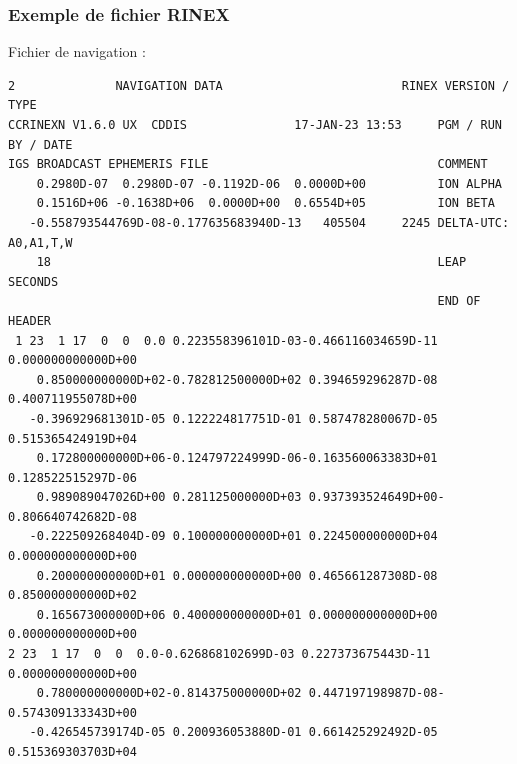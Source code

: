 \documentclass[xcolor=dvipsnames,envcountsect]{beamer}
\begin{document}
\begin{frame}
	\frametitle{Exemple de fichier RINEX}

	Fichier de navigation :
	\begin{lstlisting}[basicstyle=\tiny]
2              NAVIGATION DATA                         RINEX VERSION / TYPE
CCRINEXN V1.6.0 UX  CDDIS               17-JAN-23 13:53     PGM / RUN BY / DATE 
IGS BROADCAST EPHEMERIS FILE                                COMMENT             
	0.2980D-07  0.2980D-07 -0.1192D-06  0.0000D+00          ION ALPHA           
	0.1516D+06 -0.1638D+06  0.0000D+00  0.6554D+05          ION BETA            
   -0.558793544769D-08-0.177635683940D-13   405504     2245 DELTA-UTC: A0,A1,T,W
	18                                                      LEAP SECONDS        
															END OF HEADER       
 1 23  1 17  0  0  0.0 0.223558396101D-03-0.466116034659D-11 0.000000000000D+00
	0.850000000000D+02-0.782812500000D+02 0.394659296287D-08 0.400711955078D+00
   -0.396929681301D-05 0.122224817751D-01 0.587478280067D-05 0.515365424919D+04
	0.172800000000D+06-0.124797224999D-06-0.163560063383D+01 0.128522515297D-06
	0.989089047026D+00 0.281125000000D+03 0.937393524649D+00-0.806640742682D-08
   -0.222509268404D-09 0.100000000000D+01 0.224500000000D+04 0.000000000000D+00
	0.200000000000D+01 0.000000000000D+00 0.465661287308D-08 0.850000000000D+02
	0.165673000000D+06 0.400000000000D+01 0.000000000000D+00 0.000000000000D+00
2 23  1 17  0  0  0.0-0.626868102699D-03 0.227373675443D-11 0.000000000000D+00
	0.780000000000D+02-0.814375000000D+02 0.447197198987D-08-0.574309133343D+00
   -0.426545739174D-05 0.200936053880D-01 0.661425292492D-05 0.515369303703D+04
	\end{lstlisting}
	

\end{frame}
\end{document}
